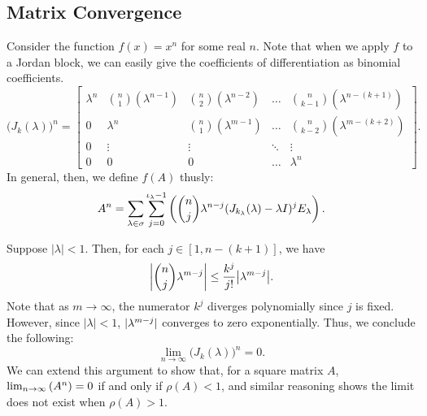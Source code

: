 \documentclass[../exploring-pagerank.tex]{subfiles}
\begin{document}
    \subsection{Matrix Convergence}
    Consider the function $f(x) = x^n$ for some real $n$. Note that when we apply $f$ to a Jordan block, we can easily give the coefficients of differentiation as binomial coefficients.
	\begin{equation}\label{eq:power_jordan_block}
		\big( J_k(\lambda) \big)^n =
		\begin{bmatrix}
			\lambda^n & \binom{n}{1}(\lambda^{n-1}) & \binom{n}{2}(\lambda^{n-2}) & \ldots & \binom{n}{k-1}(\lambda^{n-(k+1)}) \\
			0 & \lambda^n & \binom{n}{1}(\lambda^{m-1}) & \ldots & \binom{n}{k-2}(\lambda^{m-(k+2)}) \\
			0 & \vdots & \vdots & \ddots & \vdots \\
			0 & 0 & 0 & \ldots & \lambda^n
		\end{bmatrix}.
	\end{equation}
    In general, then, we define $f(A)$ thusly:
        \begin{equation}
        A^n = \sum_{\lambda \in \sigma}\sum_{j=0}^{\iota_{\lambda} - 1}\parens{ \binom{n}{j} \lambda^{n-j} (J_{k_\lambda}(\lambda) - \lambda I)^j E_{\lambda} }.
    \end{equation}

    Suppose $| \lambda | < 1$. Then, for each $j \in [1, n-(k+1)]$, we have
    \begin{equation*}
        \abs*{\binom{n}{j}\lambda^{m-j}} \leq \frac{k^j}{j!}{\abs*{\lambda^{m-j}}}.
    \end{equation*}
    Note that as $m \to \infty$, the numerator $k^j$ diverges polynomially since $j$ is fixed. However, since $| \lambda | < 1$, $\abs{\lambda^{m-j}}$ converges to zero exponentially. Thus, we conclude the following:
    \begin{equation*}
        \lim_{n\to\infty}{\big( J_k(\lambda) \big)^n} = 0.
    \end{equation*}
    We can extend this argument to show that, for a square matrix $A$, $\lim_{n\to\infty}{\parens{A^n}} = 0$ if and only if $\rho(A) < 1$, and similar reasoning shows the limit does not exist when $\rho(A) > 1$.
\end{document}
